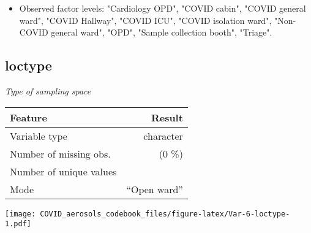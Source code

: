 \documentclass[]{article}
\providecommand{\tightlist}{%
  \setlength{\itemsep}{0pt}\setlength{\parskip}{0pt}}
\begin{document}
\begin{itemize}
\tightlist
\item
  Observed factor levels: "Cardiology OPD", "COVID cabin", "COVID
  general ward", "COVID Hallway", "COVID ICU", "COVID isolation ward",
  "Non-COVID general ward", "OPD", "Sample collection booth", "Triage".
\end{itemize}

\noindent\makebox[\linewidth]{\rule{\textwidth}{0.4pt}}

\hypertarget{loctype}{%
\subsection{loctype}\label{loctype}}

\emph{Type of sampling space}

\begin{minipage}{0.75 \textwidth}

\begin{longtable}[]{@{}lr@{}}
\toprule
\begin{minipage}[b]{0.34\columnwidth}\raggedright
Feature\strut
\end{minipage} & \begin{minipage}[b]{0.18\columnwidth}\raggedleft
Result\strut
\end{minipage}\tabularnewline
\midrule
\endhead
\begin{minipage}[t]{0.34\columnwidth}\raggedright
Variable type\strut
\end{minipage} & \begin{minipage}[t]{0.18\columnwidth}\raggedleft
character\strut
\end{minipage}\tabularnewline
\begin{minipage}[t]{0.34\columnwidth}\raggedright
Number of missing obs.\strut
\end{minipage} & \begin{minipage}[t]{0.18\columnwidth}\raggedleft
0 (0 \%)\strut
\end{minipage}\tabularnewline
\begin{minipage}[t]{0.34\columnwidth}\raggedright
Number of unique values\strut
\end{minipage} & \begin{minipage}[t]{0.18\columnwidth}\raggedleft
6\strut
\end{minipage}\tabularnewline
\begin{minipage}[t]{0.34\columnwidth}\raggedright
Mode\strut
\end{minipage} & \begin{minipage}[t]{0.18\columnwidth}\raggedleft
``Open ward''\strut
\end{minipage}\tabularnewline
\bottomrule
\end{longtable}

\end{minipage}
\begin{minipage}{0.25 \textwidth}

\texttt{[image: COVID\_aerosols\_codebook\_files/figure-latex/Var-6-loctype-1.pdf]}

\end{minipage}
\end{document}
